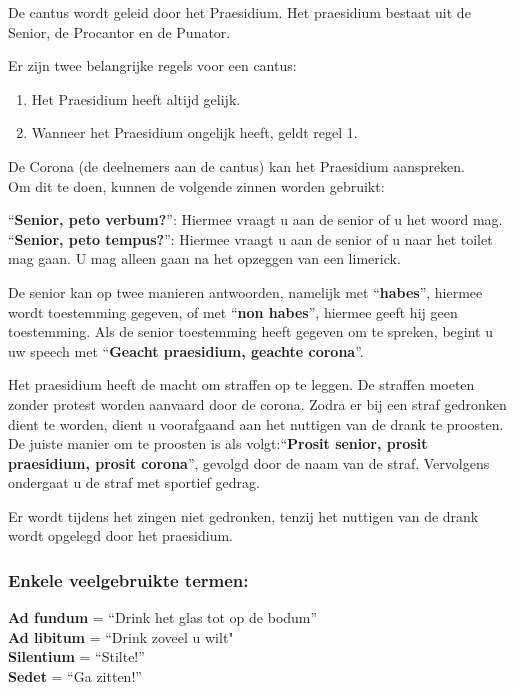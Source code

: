 De cantus wordt geleid door het Praesidium. Het praesidium bestaat uit de Senior, de Procantor en de Punator. 

Er zijn twee belangrijke regels voor een cantus:
\begin{enumerate}
    \item Het Praesidium heeft altijd gelijk.
    \item Wanneer het Praesidium ongelijk heeft, geldt regel 1. 
\end{enumerate}

De Corona (de deelnemers aan de cantus) kan het Praesidium aanspreken.\\
Om dit te doen, kunnen de volgende zinnen worden gebruikt:

“\textbf{Senior, peto verbum?}”: Hiermee vraagt u aan de senior of u het woord mag.\\
“\textbf{Senior, peto tempus?}”: Hiermee vraagt u aan de senior of u naar het toilet mag gaan. U mag alleen gaan na het opzeggen van een limerick.  

De senior kan op twee manieren antwoorden, namelijk met “\textbf{habes}”, hiermee wordt toestemming gegeven, of met “\textbf{non habes}”, hiermee geeft hij geen toestemming. Als de senior toestemming heeft gegeven om te spreken, begint u uw speech met “\textbf{Geacht praesidium, geachte corona}”. 

Het praesidium heeft de macht om straffen op te leggen. De straffen moeten zonder protest worden aanvaard door de corona. Zodra er bij een straf gedronken dient te worden, dient u voorafgaand aan het nuttigen van de drank te proosten. De juiste manier om te proosten is als volgt:“\textbf{Prosit senior, prosit praesidium, prosit corona}”, gevolgd door de naam van de straf. Vervolgens ondergaat u de straf met sportief gedrag. 

Er wordt tijdens het zingen niet gedronken, tenzij het nuttigen van de drank wordt opgelegd door het praesidium.  


\subsubsection*{Enkele veelgebruikte termen:}
\textbf{Ad fundum} = “Drink het glas tot op de bodum”\\
\textbf{Ad libitum} = “Drink zoveel u wilt"\\
\textbf{Silentium} = “Stilte!”\\
\textbf{Sedet} = “Ga zitten!”\\\\
